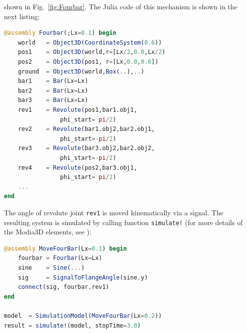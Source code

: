 shown in Fig.~\ref{fig:Fourbar}.
The Julia code of this mechanism is shown in the next listing:
%
\begin{lstlisting}[language = Julia]
@assembly Fourbar(;Lx=0.1) begin
	world	= Object3D(CoordinateSystem(0.6)) 
	pos1 	= Object3D(world,r=[Lx/2,0.0,Lx/2) 
	pos2 	= Object3D(pos1, r=[Lx,0.0,0.0]) 
	ground 	= Object3D(world,Box(..),..) 
	bar1	= Bar(Lx=Lx) 
	bar2	= Bar(Lx=Lx) 
	bar3	= Bar(Lx=Lx) 
	rev1	= Revolute(pos1,bar1.obj1,
				phi_start= pi/2) 
	rev2	= Revolute(bar1.obj2,bar2.obj1,				
				phi_start=-pi/2)	
	rev3	= Revolute(bar3.obj2,bar2.obj2, 			
				phi_start=-pi/2) 	
	rev4	= Revolute(pos2,bar3.obj1, 			
				phi_start= pi/2) 
	...
end
\end{lstlisting}
%
The angle of revolute joint \texttt{rev1} is moved kinematically via a signal. The resulting system
is simulated by calling function \texttt{simulate!} (for more details of 
the Modia3D elements, see \cite{Neumayr2018}):
% 
\begin{lstlisting}[language = Julia]
@assembly MoveFourBar(Lx=0.1) begin
	fourbar = Fourbar(Lx=Lx)
	sine 	= Sine(...)
	sig  	= SignalToFlangeAngle(sine.y)
	connect(sig, fourbar.rev1)
end

model  = SimulationModel(MoveFourBar(Lx=0.2))
result = simulate!(model, stopTime=3.0)
\end{lstlisting}
%
